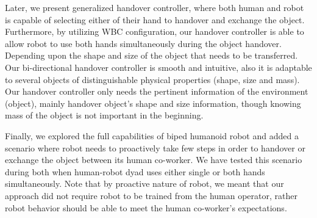 Later, we present generalized handover controller, where both human and robot is capable of selecting either of their hand to handover and exchange the object. Furthermore, by utilizing WBC configuration, our handover controller is able to allow robot to use both hands simultaneously during the object handover. Depending upon the shape and size of the object that needs to be transferred. Our bi-directional handover controller is smooth and intuitive, also it is adaptable to several objects of distinguishable physical properties (shape, size and mass). Our handover controller only needs the pertinent information of the environment (object), mainly handover object's shape and size information, though knowing mass of the object is not important in the beginning.

Finally, we explored the full capabilities of biped humanoid robot and added a scenario where robot needs to proactively take few steps in order to handover or exchange the object between its human co-worker. We have tested this scenario during both when human-robot dyad uses either single or both hands simultaneously. Note that by proactive nature of robot, we meant that our approach did not require robot to be trained from the human operator, rather robot behavior should be able to meet the human co-worker's expectations.


\clearpage %



%



%
